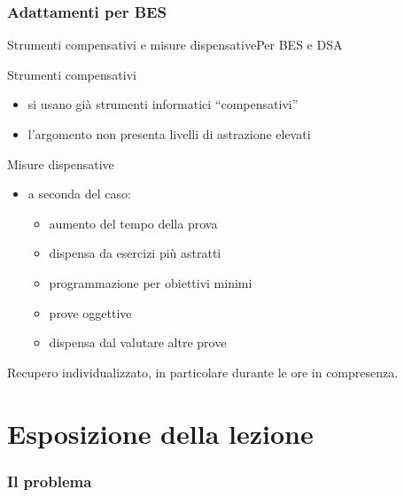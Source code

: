 \documentclass[italian]{beamer}
\begin{document}
\section[Adattamenti per BES]{Adattamenti per BES}
\begin{frame}{Strumenti compensativi e misure dispensative}{Per BES e DSA}
	
	Strumenti compensativi
	\begin{itemize}
		\item si usano gi\`a strumenti informatici ``compensativi''
		\item l'argomento non presenta livelli di astrazione elevati
	\end{itemize}
	
	Misure dispensative
	
	\begin{itemize}
		\item a seconda del caso:
		\begin{itemize}
			\item aumento del tempo della prova
			\item dispensa da esercizi pi\`u astratti
			\item programmazione per obiettivi minimi
			\item prove oggettive
			\item dispensa dal valutare altre prove
		\end{itemize}
	\end{itemize}
	
	Recupero individualizzato, in particolare durante le ore in compresenza.
			
	\note{%
		
	}%
\end{frame}

\part[Lezione simulata]{Esposizione della lezione}
\frame{\partpage}

\section[Il problema]{Il problema}
\end{document}
